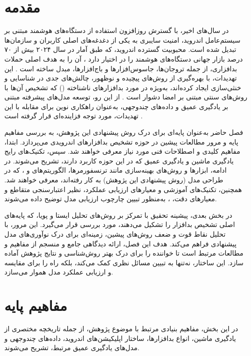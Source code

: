 \section{مقدمه}
در سال‌های اخیر، با گسترش روزافزون استفاده از دستگاه‌های هوشمند مبتنی بر سیستم‌عامل اندروید، امنیت سایبری به یکی از دغدغه‌های اصلی کاربران و سازمان‌ها تبدیل شده است. محبوبیت گسترده اندروید، که طبق آمار  در سال ۲۰۲۴ بیش از ۷۰ درصد بازار جهانی دستگاه‌های هوشمند را در اختیار دارد ، آن را به هدف اصلی حملات بدافزاری، از جمله تروجان‌ها، جاسوس‌افزارها و باج‌افزارها، مبدل ساخته است \cite{AndroidSecurity}. این تهدیدات، با بهره‌گیری از روش‌های پیچیده و نوظهور، چالش‌های جدی در شناسایی و خنثی‌سازی ایجاد کرده‌اند، به‌ویژه در مورد بدافزارهای ناشناخته () که تشخیص آن‌ها با روش‌های سنتی مبتنی بر امضا دشوار است \cite{AndroidMalwareSurvey}. از این رو، توسعه مدل‌های پیشرفته مبتنی بر یادگیری عمیق و داده‌های چندوجهی، به‌عنوان راهکاری نوین برای مقابله با این تهدیدات، مورد توجه فزاینده‌ای قرار گرفته است \cite{DeepLearningMalware}.

فصل حاضر به‌عنوان پایه‌ای برای درک روش پیشنهادی این پژوهش، به بررسی مفاهیم پایه و مرور مطالعات پیشین در حوزه تشخیص بدافزارهای اندرویدی می‌پردازد. ابتدا، مفاهیم کلیدی و اصطلاحات فنی مورد نیاز معرفی خواهند شد. سپس، تکنیک‌های رایج یادگیری ماشین و یادگیری عمیق که در این حوزه کاربرد دارند، تشریح می‌شوند. در ادامه، ابزارها و روش‌های بهینه‌سازی مانند ترنسفورمرها، الگوریتم‌های  و ، که در طراحی مدل  (روش پیشنهادی این پژوهش) به کار رفته‌اند، معرفی خواهند شد. همچنین، تکنیک‌های آموزشی و معیارهای ارزیابی عملکرد، نظیر اعتبارسنجی متقاطع و معیارهای دقت، ، به‌منظور تبیین چارچوب ارزیابی مدل توضیح داده می‌شوند.

در بخش بعدی، پیشینه تحقیق با تمرکز بر روش‌های تحلیل ایستا و پویا، که پایه‌های اصلی تشخیص بدافزار را تشکیل می‌دهند، مورد بررسی قرار می‌گیرد. این مرور، با تحلیل نقاط قوت و ضعف روش‌های پیشین، زمینه‌ای برای درک نوآوری‌های مدل پیشنهادی فراهم می‌کند. هدف این فصل، ارائه دیدگاهی جامع و منسجم از مفاهیم و مطالعات مرتبط است تا خواننده را برای درک بهتر روش‌شناسی و نتایج پژوهش آماده سازد. این ساختار، نه‌تنها به تبیین مسائل نظری کمک می‌کند، بلکه راه را برای مقایسه و ارزیابی عملکرد مدل  هموار می‌سازد.

\section{مفاهیم پایه}
در این بخش، مفاهیم بنیادی مرتبط با موضوع پژوهش، از جمله تاریخچه مختصری از یادگیری ماشین، انواع بدافزارها، ساختار اپلیکیشن‌های اندروید، داده‌های چندوجهی و مدل‌های یادگیری عمیق مرتبط، تشریح می‌شوند.

